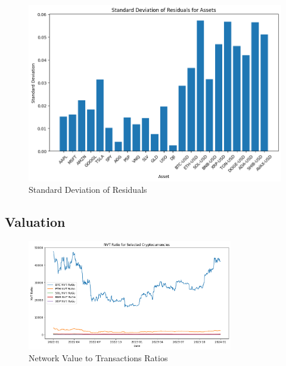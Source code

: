 \begin{figure}
    \centering
    \includegraphics[width=\textwidth]{code/volatility-analysis/garch-with-mulit-assets/standard_deviation.png}
    \caption{Standard Deviation of Residuals}
    \label{fig:exp_return}
\end{figure}



\subsection{Valuation}



\begin{figure}
    \centering
    \includegraphics[width=0.8\textwidth]{code/valuation-techniques/nvt_ratio.png}
    \caption{Network Value to Transactions Ratios}
    \label{fig:beta}
\end{figure}


